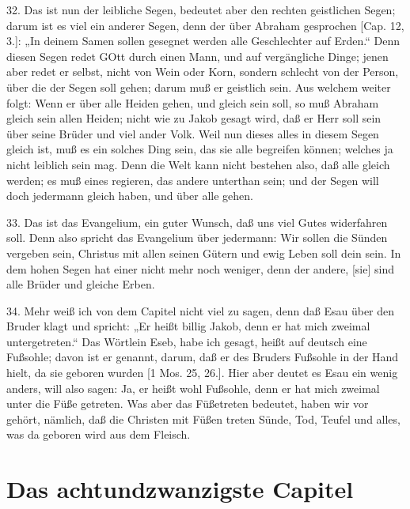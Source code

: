 32. Das ist nun der leibliche Segen, bedeutet aber den rechten geistlichen Segen; darum ist es viel ein anderer Segen, denn der über Abraham gesprochen [Cap. 12, 3.]: „In deinem Samen sollen gesegnet werden alle Geschlechter auf Erden.“ Denn diesen Segen redet GOtt durch einen Mann, und auf vergängliche Dinge; jenen aber redet er selbst, nicht von Wein oder Korn, sondern schlecht von der Person, über die der Segen soll gehen; darum muß er geistlich sein. Aus welchem weiter folgt: Wenn er über alle Heiden gehen, und gleich sein soll, so muß Abraham gleich sein allen Heiden; nicht wie zu Jakob gesagt wird, daß er Herr soll sein über seine Brüder und viel ander Volk. Weil nun dieses alles in diesem Segen gleich ist, muß es ein solches Ding sein, das sie alle begreifen können; welches ja nicht leiblich sein mag. Denn die Welt kann nicht bestehen also, daß alle gleich werden; es muß eines regieren, das andere unterthan sein; und der Segen will doch jedermann gleich haben, und über alle gehen.

33. Das ist das Evangelium, ein guter Wunsch, daß uns viel Gutes widerfahren soll. Denn also spricht das Evangelium über jedermann: Wir sollen die Sünden vergeben sein, Christus mit allen seinen Gütern und ewig Leben soll dein sein. In dem hohen Segen hat einer nicht mehr noch weniger, denn der andere, [sie] sind alle Brüder und gleiche Erben.

34. Mehr weiß ich von dem Capitel nicht viel zu sagen, denn daß Esau über den Bruder klagt und spricht: „Er heißt billig Jakob, denn er hat mich zweimal untergetreten.“ Das Wörtlein Eseb, habe ich gesagt, heißt auf deutsch eine Fußsohle; davon ist er genannt, darum, daß er des Bruders Fußsohle in der Hand hielt, da sie geboren wurden [1 Mos. 25, 26.]. Hier aber deutet es Esau ein wenig anders, will also sagen: Ja, er heißt wohl Fußsohle, denn er hat mich zweimal unter die Füße getreten. Was aber das Füßetreten bedeutet, haben wir vor gehört, nämlich, daß die Christen mit Füßen treten Sünde, Tod, Teufel und alles, was da geboren wird aus dem Fleisch.

\section{Das achtundzwanzigste Capitel}

